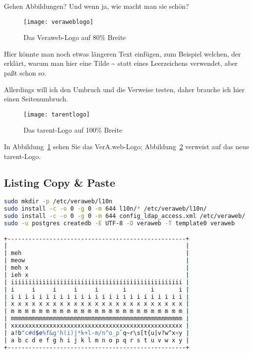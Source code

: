 \documentclass{tarentanleitung}
\begin{document}
Gehen Abbildungen? Und wenn ja, wie macht man sie schön?

\begin{figure}[h!]
 \centering\texttt{[image: veraweblogo]}
 \caption{Das Veraweb-Logo auf 80\% Breite}
 \label{fig:logovw}
\end{figure}

Hier könnte man noch etwas längeren Text einfügen, zum Beispiel
welchen, der erklärt, warum man hier eine Tilde \~{} statt eines
Leerzeichens verwendet, aber paßt schon so.

\newpage

Allerdings will ich den Umbruch und die Verweise testen, daher
brauche ich hier einen Seitenumbruch.

\begin{figure}[h!]
 \centering\texttt{[image: tarentlogo]}
 \caption{Das tarent-Logo auf 100\% Breite}
 \label{fig:logotarent}
\end{figure}

In Abbildung~\ref{fig:logovw} sehen Sie das VerA.web-Logo;
Abbildung~\ref{fig:logotarent} verweist auf das neue tarent-Logo.

\subsection{Listing Copy \& Paste}

\begin{lstlisting}[language=sh,columns=fixed]
sudo mkdir -p /etc/veraweb/l10n
sudo install -c -o 0 -g 0 -m 644 l10n/* /etc/veraweb/l10n/
sudo install -c -o 0 -g 0 -m 644 config_ldap_access.xml /etc/veraweb/
sudo -u postgres createdb -E UTF-8 -O veraweb -T template0 veraweb

+---------------------------------------------------+
|                                                   |
| meh                                               |
| meow                                              |
| meh x                                             |
| ieh x                                             |
| iiiiiiiiiiiiiiiiiiiiiiiiiiiiiiiiiiiiiiiiiiiiiiiii |
| i     i     i     i     i       i       i       i |
| i i i i i i i i i i i i i i i i i i i i i i i i i |
| x x x x x x x x x x x x x x x x x x x x x x x x x |
| m m m m m m m m m m m m m m m m m m m m m m m m m |
| mmmmmmmmmmmmmmmmmmmmmmmmmmmmmmmmmmmmmmmmmmmmmmmmm |
| xxxxxxxxxxxxxxxxxxxxxxxxxxxxxxxxxxxxxxxxxxxxxxxxx |
| a!b"c#d$e%f&g'h(i)j*k+l-m/n^o_p`q~r\s[t{u|v?w^x<y |
| a b c d e f g h i j k l m n o p q r s t u v w x y |
+---------------------------------------------------+

\end{lstlisting}
\end{document}
